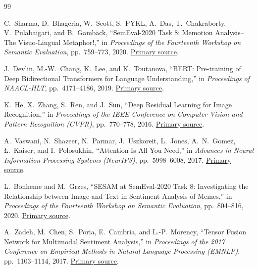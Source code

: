 \documentclass[11pt,a4paper]{article}
\begin{document}
\clearpage
\begin{thebibliography}{99}

C.~Sharma, D.~Bhageria, W.~Scott, S.~PYKL, A.~Das, T.~Chakraborty, V.~Pulabaigari, and B.~Gamb\"ack,
\newblock ``SemEval-2020 Task 8: Memotion Analysis--The Visuo-Lingual Metaphor!,''
\newblock in \emph{Proceedings of the Fourteenth Workshop on Semantic Evaluation}, pp.~759--773, 2020.
\newblock \href{https://aclanthology.org/2020.semeval-1.99/}{Primary source}.

J.~Devlin, M.-W.~Chang, K.~Lee, and K.~Toutanova,
\newblock ``BERT: Pre-training of Deep Bidirectional Transformers for Language Understanding,''
\newblock in \emph{Proceedings of NAACL-HLT}, pp.~4171--4186, 2019.
\newblock \href{https://aclanthology.org/N19-1423/}{Primary source}.

K.~He, X.~Zhang, S.~Ren, and J.~Sun,
\newblock ``Deep Residual Learning for Image Recognition,''
\newblock in \emph{Proceedings of the IEEE Conference on Computer Vision and Pattern Recognition (CVPR)}, pp.~770--778, 2016.
\newblock \href{https://openaccess.thecvf.com/content_cvpr_2016/html/He_Deep_Residual_Learning_CVPR_2016_paper.html}{Primary source}.

A.~Vaswani, N.~Shazeer, N.~Parmar, J.~Uszkoreit, L.~Jones, A.~N.~Gomez, \L.~Kaiser, and I.~Polosukhin,
\newblock ``Attention Is All You Need,''
\newblock in \emph{Advances in Neural Information Processing Systems (NeurIPS)}, pp.~5998--6008, 2017.
\newblock \href{https://arxiv.org/abs/1706.03762}{Primary source}.

L.~Bonheme and M.~Grzes,
\newblock ``SESAM at SemEval-2020 Task 8: Investigating the Relationship between Image and Text in Sentiment Analysis of Memes,''
\newblock in \emph{Proceedings of the Fourteenth Workshop on Semantic Evaluation}, pp.~804--816, 2020.
\newblock \href{https://aclanthology.org/2020.semeval-1.102/}{Primary source}.

A.~Zadeh, M.~Chen, S.~Poria, E.~Cambria, and L.-P.~Morency,
\newblock ``Tensor Fusion Network for Multimodal Sentiment Analysis,''
\newblock in \emph{Proceedings of the 2017 Conference on Empirical Methods in Natural Language Processing (EMNLP)}, pp.~1103--1114, 2017.
\newblock \href{https://aclanthology.org/D17-1115/}{Primary source}.

\end{thebibliography}
\end{document}
